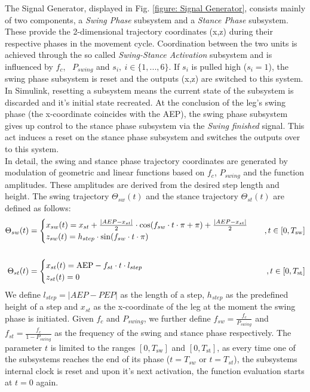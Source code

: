 The Signal Generator, displayed in Fig. \ref{figure: Signal Generator}, consists mainly of two components, a \textit{Swing Phase} subsystem and a \textit{Stance Phase} subsystem.
These provide the 2-dimensional trajectory coordinates (x,z) during their respective phases in the movement cycle.
Coordination between the two units is achieved through the so called \textit{Swing-Stance Activation} subsystem and is influenced by $f_c$, \ $P_{swing}$ and $s_i,\ i \in \{1,...,6\}$.
If $s_i$ is pulled high ($s_i=1$), the swing phase subsystem is reset and the outputs (x,z) are switched to this system.
In Simulink, resetting a subsystem means the current state of the subsystem is discarded and it's initial state recreated.
At the conclusion of the leg's swing phase (the x-coordinate coincides with the AEP), the swing phase subsystem gives up control to the stance phase subsystem via the \textit{Swing finished} signal.
This act induces a reset on the stance phase subsystem and switches the outputs over to this system.
\\
In detail, the swing and stance phase trajectory coordinates are generated by modulation of geometric and linear functions based on $f_c$, $P_{swing}$ and the function amplitudes.
These amplitudes are derived from the desired step length and height.
The swing trajectory $\Theta_{sw}(t)$ and the stance trajectory $\Theta_{st}(t)$ are defined as follows:
\begin{align}
	\Theta_{sw}(t) & = 
	\begin{cases}
		x_{sw}(t) = x_{st} + \frac{|AEP - x_{st}|}{2} \cdot \cos(f_{sw} \cdot t \cdot \pi + \pi) + \frac{|AEP - x_{st}|}{2} \\
		z_{sw}(t) = h_{step} \cdot \sin(f_{sw} \cdot t \cdot \pi) \\
	\end{cases} & , t \in [0,T_\text{sw}] \\
	\notag \\
	\Theta_{st}(t) & =
	\begin{cases}
		x_{st}(t) = \text{AEP} - f_{st} \cdot t \cdot l_{step}\\
		z_{st}(t) = 0
	\end{cases} & , t \in [0, T_\text{st}]    
\end{align}
We define $l_{step} = |AEP - PEP|$ as the length of a step, $h_{step}$ as the predefined height of a step and $x_{st}$ as the x-coordinate of the leg at the moment the swing phase is initiated.
Given $f_c$ and $P_{swing}$, we further define $f_{sw} = \frac{f_c}{P_{swing}}$ and $f_{st} = \frac{f_c}{1-P_{swing}}$ as the frequency of the swing and stance phase respectively.
The parameter $t$ is limited to the ranges $[0,T_\text{sw}]$ and $[0, T_\text{st}]$, as every time one of the subsystems reaches the end of its phase ($t=T_{sw}$ or $t=T_{st}$), the subsystems internal clock is reset and upon it's next activation, the function evaluation starts at $t=0$ again.

